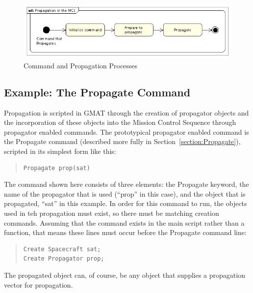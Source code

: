 \begin{figure}[htb]
\begin{center}
\includegraphics[320,84]{Images/PropagationintheMCS.png}
\caption[Command and Propagation Processes]{\label{figure:CommandPropagationOverview}Command and
Propagation Processes}
\end{center}
\end{figure}

\subsection{Example: The Propagate Command}

Propagation is scripted in GMAT through the creation of propagator objects and the incorporation of
these objects into the Mission Control Sequence through propagator enabled commands.  The
prototypical propagator enabled command is the Propagate command (described more fully in
Section~\ref{section:Propagate}), scripted in its simplest form like this:

\begin{quote}
\begin{verbatim}
Propagate prop(sat)
\end{verbatim}
\end{quote}

\noindent The command shown here consists of three elements: the Propagate keyword, the name of the
propagator that is used (``prop'' in this case), and the object that is propagated, ``sat'' in
this example.  In order for this command to run, the objects used in teh propagation must exist, so
there must be matching creation commands.  Assuming that the command exists in the main script
rather than a function, that means these lines must occur before the Propagate command line:

\begin{quote}
\begin{verbatim}
Create Spacecraft sat;
Create Propagator prop;
\end{verbatim}
\end{quote}

\noindent The propagated object can, of course, be any object that supplies a propagation vector for
propagation.

